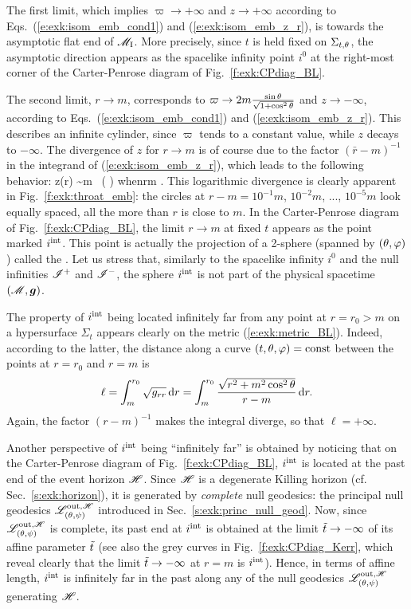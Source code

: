 The first limit, which implies $\varpi \to +\infty$ and $z \to +\infty$
according to Eqs.~(\ref{e:exk:isom_emb_cond1}) and (\ref{e:exk:isom_emb_z_r}),
is towards the asymptotic flat end of $\mathscr{M}_{\rm I}$.
More precisely, since $t$ is held fixed on $\Sigma_{t,\theta}$, the asymptotic
direction appears as the
spacelike infinity point $i^0$ at the right-most corner
of the Carter-Penrose diagram of Fig.~\ref{f:exk:CPdiag_BL}.

The second limit, $r\to m$, corresponds to
$\varpi \to 2m\frac{\sin\theta}{\sqrt{1 + \cos^2\theta}}$ and $z\to -\infty$,
according to Eqs.~(\ref{e:exk:isom_emb_cond1}) and (\ref{e:exk:isom_emb_z_r}).
This describes an infinite cylinder, since
$\varpi$ tends to a constant value, while $z$ decays to $-\infty$.
The divergence of $z$ for $r\to m$ is of course due to the
factor $(\bar{r} - m)^{-1}$ in the integrand of (\ref{e:exk:isom_emb_z_r}),
which leads to the following behavior:
\be
    z(r) \sim m  \, \ln \left(  \right)
    \quad\mbox{when}\quad r\to m .
\ee
This logarithmic divergence is clearly apparent in Fig.~\ref{f:exk:throat_emb}:
the circles at $r - m = 10^{-1} m$, $10^{-2} m$, ..., $10^{-5} m$ look
equally spaced, all the more than $r$ is close to $m$.
In the Carter-Penrose diagram of Fig.~\ref{f:exk:CPdiag_BL}, the limit $r\to m$
at fixed $t$ appears as the point marked $i^{\rm int}$. This point is actually
the projection of a 2-sphere (spanned by $(\theta,\varphi)$) called
the . Let us stress that, similarly to the spacelike infinity $i^0$
and the null infinities $\mathscr{I}^+$ and $\mathscr{I}^-$, the sphere $i^{\rm int}$
is not part of the physical spacetime $(\mathscr{M},\bm{g})$.

The property of $i^{\rm int}$ being located infinitely far from any point at $r=r_0>m$ on
a hypersurface $\Sigma_t$ appears clearly
on the metric (\ref{e:exk:metric_BL}). Indeed,
according to the latter, the distance along a
curve $(t,\theta,\varphi)=\mathrm{const}$ between the points
at $r=r_0$ and $r=m$ is
\[
    \ell = \int_{m}^{r_0} \sqrt{g_{rr}} \, \mathrm{d} r =
    \int_{m}^{r_0} \frac{\sqrt{r^2 + m^2\cos^2\theta}}{r - m} \, \mathrm{d} r .
\]
Again, the factor $(r - m)^{-1}$ makes the integral diverge, so that $\ell = +\infty$.

Another perspective of $i^{\rm int}$ being ``infinitely far'' is obtained by noticing
that on the Carter-Penrose diagram of Fig.~\ref{f:exk:CPdiag_BL},
$i^{\rm int}$ is located at the past end of the event horizon $\mathscr{H}$. Since
$\mathscr{H}$ is a degenerate Killing horizon (cf. Sec.~\ref{s:exk:horizon}), it is generated by
\emph{complete} null geodesics: the principal null geodesics $\mathscr{L}^{{\rm out},\mathscr{H}}_{(\theta,\psi)}$
introduced in Sec.~\ref{s:exk:princ_null_geod}. Now, since
$\mathscr{L}^{{\rm out},\mathscr{H}}_{(\theta,\psi)}$ is complete, its past end at $i^{\rm int}$ is obtained at the limit ${\tilde t}\to -\infty$ of its
affine parameter ${\tilde t}$ (see also the grey curves in Fig.~\ref{f:exk:CPdiag_Kerr}, which reveal clearly that
the limit ${\tilde t}\to -\infty$ at $r=m$ is
$i^{\rm int}$). Hence, in terms of affine length, $i^{\rm int}$ is infinitely
far in the past along any of the null geodesics $\mathscr{L}^{{\rm out},\mathscr{H}}_{(\theta,\psi)}$
generating $\mathscr{H}$.

